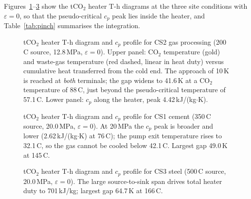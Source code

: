 Figures~\ref{fig:pinch_200}--\ref{fig:pinch_500} show the tCO$_2$ heater T-h
diagrams at the three site conditions with $\varepsilon = 0$, so that the
pseudo-critical $c_p$ peak lies inside the heater, and
Table~\ref{tab:pinch} summarises the integration.

\begin{figure}[H]
\centering
{}
\caption{tCO$_2$ heater T-h diagram and $c_p$ profile for CS2 gas processing
(200\,\textdegree C source, 12.8\,MPa, $\varepsilon = 0$). Upper panel: CO$_2$
temperature (gold) and waste-gas temperature (red dashed, linear in heat
duty) versus cumulative heat transferred from the cold end. The approach of
10\,K is reached at \emph{both} terminals; the gap widens to 41.6\,K at a
CO$_2$ temperature of 88\,\textdegree C, just beyond the pseudo-critical
temperature of 57.1\,\textdegree C. Lower panel: $c_p$ along the heater, peak
4.42\,kJ/(kg$\cdot$K).}
\label{fig:pinch_200}
\end{figure}

\begin{figure}[H]
\centering
{}
\caption{tCO$_2$ heater T-h diagram and $c_p$ profile for CS1 cement
(350\,\textdegree C source, 20.0\,MPa, $\varepsilon = 0$). At 20\,MPa the $c_p$
peak is broader and lower (2.62\,kJ/(kg$\cdot$K) at 76\,\textdegree C); the
pump exit temperature rises to 32.1\,\textdegree C, so the gas cannot be
cooled below 42.1\,\textdegree C. Largest gap 49.0\,K at 145\,\textdegree C.}
\label{fig:pinch_350}
\end{figure}

\begin{figure}[H]
\centering
{}
\caption{tCO$_2$ heater T-h diagram and $c_p$ profile for CS3 steel
(500\,\textdegree C source, 20.0\,MPa, $\varepsilon = 0$). The large
source-to-sink span drives total heater duty to 701\,kJ/kg; largest gap
64.7\,K at 166\,\textdegree C.}
\label{fig:pinch_500}
\end{figure}

